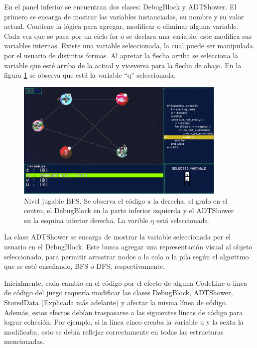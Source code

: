 En el panel inferior se encuentran dos clases: DebugBlock y ADTShower. El primero se encarga de mostrar las variables instanciadas, su nombre y su valor actual. Contiene la lógica para agregar, modificar o eliminar alguna variable. Cada vez que se pasa por un ciclo for o se declara una variable, este modifica sus variables internas. Existe una variable seleccionada, la cual puede ser manipulada por el usuario de distintas formas. Al apretar la flecha arriba se selecciona la variable que esté arriba de la actual y viceversa para la flecha de abajo. En la figura \ref{BFSFullGame} se observa que está la variable ``q'' seleccionada.

\begin{figure}[h]
	\centering
	\includegraphics[width=0.9\textwidth]{imagenes/BFSFullGame.png}
	\caption{Nivel jugable BFS. Se observa el código a la derecha, el grafo en el centro, el DebugBlock en la parte inferior izquierda y el ADTShower en la esquina inferior derecha. La varible q está seleccionada.}
	\label{BFSFullGame}
\end{figure}

La clase ADTShower se encarga de mostrar la variable seleccionada por el usuario en el DebugBlock. Este busca agregar una representación visual al objeto seleccionado, para permitir arrastrar nodos a la cola o la pila según el algoritmo que se esté enseñando, BFS o DFS, respectivamente.

Inicialmente, cada cambio en el código por el efecto de alguna CodeLine o línea de código del juego requería modificar las clases DebugBlock, ADTShower, StoredData (Explicada más adelante) y afectar la misma línea de código. Además, estos efectos debían traspasarse a las siguientes líneas de código para lograr cohesión. Por ejemplo, si la línea cinco creaba la variable u y la sexta la modificaba, esto se debía reflejar correctamente en todas las estructuras mencionadas.

